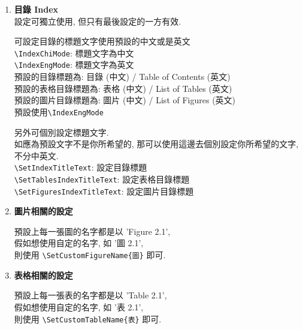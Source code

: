 \begin{enumerate}
{    e.g\\
    \verb|\SetAbstractChiKeywords{關鍵字 A}{關鍵字 B}{關鍵字 C}|\\
    \verb|\SetAbstractEngKeywords{Keyword A}{Keyword B}{Keyword C}|\\
    \verb|\SetAbstractExtKeywords{Keyword A}{Keyword B}{Keyword C}|\\
    英文延伸摘要的關鍵字理應會跟英文版摘要的關鍵字是一樣, 但為了同學能編寫不同內容和關鍵字, 故可獨立設定.
  } %

  \item
  {
    \textbf{目錄 Index}\\
    設定可獨立使用, 但只有最後設定的一方有效.

    可設定目錄的標題文字使用預設的中文或是英文\\
    \verb|\IndexChiMode|:  標題文字為中文\\
    \verb|\IndexEngMode|:  標題文字為英文\\
    預設的目錄標題為: 目錄 (中文) / Table of Contents (英文)\\
    預設的表格目錄標題為: 表格 (中文) / List of Tables (英文)\\
    預設的圖片目錄標題為: 圖片 (中文) / List of Figures (英文)\\
    預設使用\verb|\IndexEngMode|

    另外可個別設定標題文字.\\
    如應為預設文字不是你所希望的, 那可以使用這邊去個別設定你所希望的文字, 不分中英文.\\
    \verb|\SetIndexTitleText|: 設定目錄標題\\
    \verb|\SetTablesIndexTitleText|: 設定表格目錄標題\\
    \verb|\SetFiguresIndexTitleText|: 設定圖片目錄標題
  } %

  \item
  {
    \textbf{圖片相關的設定}

    預設上每一張圖的名字都是以 'Figure 2.1',\\
    假如想使用自定的名字, 如 '圖 2.1',\\
    則使用 \verb|\SetCustomFigureName{圖}| 即可.
  } %

  \item
  {
    \textbf{表格相關的設定}

    預設上每一張表的名字都是以 'Table 2.1',\\
    假如想使用自定的名字, 如 '表 2.1',\\
    則使用 \verb|\SetCustomTableName{表}| 即可.
  } %


\end{enumerate}
